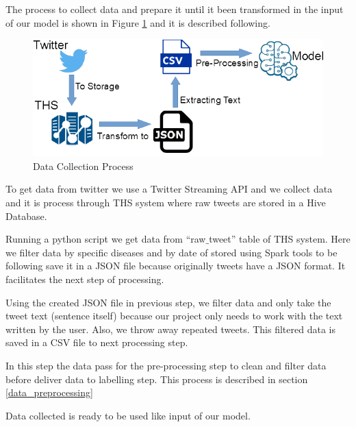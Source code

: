 \documentclass[12pt]{report}
\begin{document}
The process to collect data and prepare it until it been transformed in the input of our model is shown in Figure \ref{figure:data_collection} and it is described following.

\begin{figure}[H]	
	\centering
	\includegraphics[width=150mm, scale = 1]{images/8_data_collection.png}	
	\caption{Data Collection Process}	
	\label{figure:data_collection}
\end{figure}

\begin{steps}
	
	\item To get data from twitter we use a Twitter Streaming \ac{API} and we collect data and it is process through \ac{THS} system where raw tweets are stored in a Hive Database.
	
	\item Running a python script we get data from ``raw$\_$tweet'' table of \ac{THS} system. Here we filter data by specific diseases and by date of stored using Spark tools to be following save it in a \ac{JSON} file because originally tweets have a \ac{JSON} format. It facilitates the next step of processing.
	
	\item Using the created \ac{JSON} file in previous step, we filter data and only take the tweet text (sentence itself) because our project only needs to work with the text written by the user. Also, we throw away repeated tweets. This filtered data is saved in a \ac{CSV} file to next processing step.
	
	\item In this step the data pass for the pre-processing step to clean and filter data before deliver data to labelling step. This process is described in section \ref{data_preprocessing} 
	
	\item Data collected is ready to be used like input of our model.
	
\end{steps}
\end{document}
